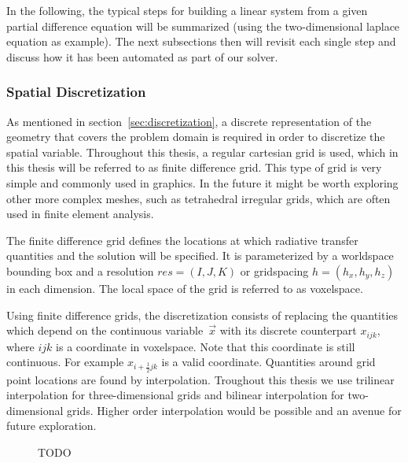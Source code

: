 In the following, the typical steps for building a linear system from a given partial difference equation will be summarized (using the two-dimensional laplace equation as example). The next subsections then will revisit each single step and discuss how it has been automated as part of our solver.

\subsubsection*{Spatial Discretization}

As mentioned in section~\ref{sec:discretization}, a discrete representation of the geometry that covers the problem domain is required in order to discretize the spatial variable. Throughout this thesis, a regular cartesian grid is used, which in this thesis will be referred to as finite difference grid. This type of grid is very simple and commonly used in graphics. In the future it might be worth exploring other more complex meshes, such as tetrahedral irregular grids, which are often used in finite element analysis. 

The finite difference grid defines the locations at which radiative transfer quantities and the solution will be specified. It is parameterized by a worldspace bounding box and a resolution $res=(I,J,K)$ or gridspacing $h=(h_x, h_y, h_z)$ in each dimension. The local space of the grid is referred to as voxelspace.

Using finite difference grids, the discretization consists of replacing the quantities which depend on the continuous variable~$\vec{x}$ with its discrete counterpart $x_{ijk}$, where $ijk$ is a coordinate in voxelspace. Note that this coordinate is still continuous. For example $x_{i+\frac{1}{2}jk}$ is a valid coordinate. Quantities around grid point locations are found by interpolation. Troughout this thesis we use trilinear interpolation for three-dimensional grids and bilinear interpolation for two-dimensional grids. Higher order interpolation would be possible and an avenue for future exploration.
\begin{figure}[h]
\centering
{}
\caption{TODO}
\label{fig:pn_solver_finite_difference_grid}
\end{figure}

